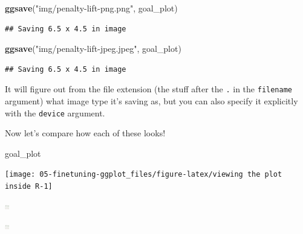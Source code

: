 \documentclass[
]{book}
\newenvironment{Shaded}{\begin{snugshade}}{\end{snugshade}}
\newcommand{\FunctionTok}[1]{\textcolor[rgb]{0.13,0.29,0.53}{\textbf{#1}}}
\newcommand{\NormalTok}[1]{#1}
\newcommand{\StringTok}[1]{\textcolor[rgb]{0.31,0.60,0.02}{#1}}
\begin{document}
\begin{Shaded}
\begin{Highlighting}[]
\FunctionTok{ggsave}\NormalTok{(}\StringTok{"img/penalty{-}lift{-}png.png"}\NormalTok{, goal\_plot)}
\end{Highlighting}
\end{Shaded}

\begin{verbatim}
## Saving 6.5 x 4.5 in image
\end{verbatim}

\begin{Shaded}
\begin{Highlighting}[]
\FunctionTok{ggsave}\NormalTok{(}\StringTok{"img/penalty{-}lift{-}jpeg.jpeg"}\NormalTok{, goal\_plot)}
\end{Highlighting}
\end{Shaded}

\begin{verbatim}
## Saving 6.5 x 4.5 in image
\end{verbatim}

It will figure out from the file extension (the stuff after the \texttt{.} in the \texttt{filename} argument) what image type it's saving as, but you can also specify it explicitly with the \texttt{device} argument.

Now let's compare how each of these looks!

\begin{Shaded}
\begin{Highlighting}[]
\NormalTok{goal\_plot}
\end{Highlighting}
\end{Shaded}

\begin{center}\texttt{[image: 05-finetuning-ggplot\_files/figure-latex/viewing the plot inside R-1]} \end{center}

\begin{center}\includegraphics[width=7px]{img/penalty-lift-svg} \end{center}

\begin{center}\includegraphics[width=7px]{img/penalty-lift-png} \end{center}
\end{document}
